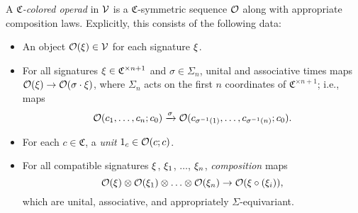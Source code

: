 \documentclass[a4paper,10pt
,draft
]{article}%
\renewcommand{\1}{\eta}%
\begin{document}
\begin{definition}
      A \textit{$\mathfrak C$-colored operad} in $\mathcal V$ 
      is a $\mathfrak C$-symmetric sequence $\mathcal{O}$ along with appropriate composition laws.
      Explicitly, this consists of the following data:
      \begin{itemize} %
      \item An object $\mathcal{O}(\xi) \in \mathcal V$ for each signature $\xi$.
      \item For all signatures $\xi \in \mathfrak C^{\times n+1}$ and $\sigma \in \Sigma_n$,
            unital and associative times maps $\mathcal{O}(\xi) \to \mathcal{O}(\sigma \cdot \xi)$,
            where $\Sigma_n$ acts on the first $n$ coordinates of $\mathfrak C^{\times n+1}$;
            i.e., maps
            \begin{equation}
                  \mathcal{O}(c_1, \ldots, c_n; c_0) \xrightarrow{\sigma} \mathcal{O}(c_{\sigma^{-1}(1)}, \ldots, c_{\sigma^{-1}(n)}; c_0).
            \end{equation}
      \item For each $c \in \mathfrak C$, a \textit{unit} $1_c \in \mathcal{O}(c;c)$.                        
      \item For all compatible signatures $\xi$, $\xi_1$, $\dots$, $\xi_n$,
            \textit{composition} maps
            \begin{equation}
                  \mathcal{O}(\xi) \otimes \mathcal{O}(\xi_1) \otimes \ldots \otimes \mathcal{O}(\xi_n) \to \mathcal{O}(\xi \circ (\xi_i)),
            \end{equation}
            which are unital, associative, and appropriately $\Sigma$-equivariant.
      \end{itemize}
\end{definition}
\end{document}
